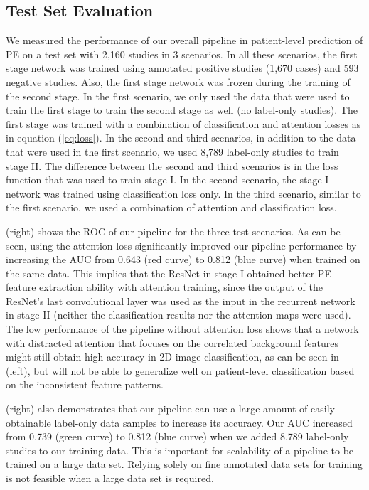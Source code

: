 \documentclass{midl} %
\begin{document}
\subsection{Test Set Evaluation}
\label{ssec:test-set-eval}

We measured the performance of our overall pipeline in patient-level prediction of PE on a test set with 2,160 studies in 3 scenarios. In all these scenarios, the first stage network was trained using annotated positive studies (1,670 cases) and 593 negative studies. Also, the first stage network was frozen during the training of the second stage. In the first scenario, we only used the data that were used to train the first stage to train the second stage as well (no label-only studies). The first stage was trained with a combination of classification and attention losses as in equation (\ref{eq:loss}). In the second and third scenarios, in addition to the data that were used in the first scenario, we used 8,789 label-only studies to train stage II. The difference between the second and third scenarios is in the loss function that was used to train stage I. In the second scenario, the stage I network was trained using classification loss only. In the third scenario, similar to the first scenario, we used a combination of attention and classification loss.

 (right) shows the ROC of our pipeline for the three test scenarios. As can be seen, using the attention loss significantly improved our pipeline performance by increasing the AUC from 0.643 (red curve) to 0.812 (blue curve) when trained on the same data. This implies that the ResNet in stage I obtained better PE feature extraction ability with attention training, since the output of the ResNet's last convolutional layer was used as the input in the recurrent network in stage II (neither the classification results nor the attention maps were used). The low performance of the pipeline without attention loss shows that a network with distracted attention that focuses on the correlated background features might still obtain high accuracy in 2D image classification, as can be seen in  (left), but will not be able to generalize well on patient-level classification based on the inconsistent feature patterns.

 (right) also demonstrates that our pipeline can use a large amount of easily obtainable label-only data samples to increase its accuracy. Our AUC increased from 0.739 (green curve) to 0.812 (blue curve) when we added 8,789 label-only studies to our training data. This is important for scalability of a pipeline to be trained on a large data set. Relying solely on fine annotated data sets for training is not feasible when a large data set is required.
\end{document}
